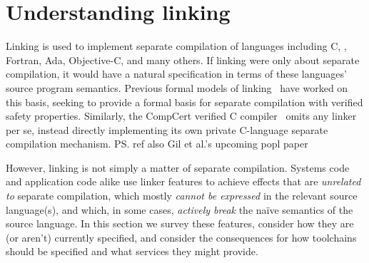 \section{Understanding linking}

Linking is used to implement separate compilation 
of languages including C, \Cplusplus{}, Fortran, Ada, Objective-C, and
many others.
If linking were only about separate compilation, it would have a natural specification
in terms of these languages' source program semantics.
Previous formal models of linking~\cite{cardelli-program-1997, glew-type-safe-1999, machkasova-calculus-2000, wells-equational-2000, fagorzi-calculus-2007}
have worked on this basis, 
seeking to provide a formal basis for separate compilation with verified safety properties.
Similarly, the CompCert verified C compiler~\cite{leroy-formal-2009} 
omits any linker per se, instead 
directly implementing its own private C-language separate compilation mechanism.
\ps{ref also Gil et al.'s upcoming popl paper}

However, linking is not simply a matter of separate compilation.
Systems code and application code alike 
use linker features to achieve effects that are \emph{unrelated to} separate compilation,
which mostly \emph{cannot be expressed} in the relevant source language(s), 
and which, in some cases, \emph{actively break} the na\"ive semantics of the source language.
In this section we survey these features,
consider how they are (or aren't) currently specified, 
and consider the consequences for 
how toolchains should be specified and what services they might provide.

% 
% 
% 


